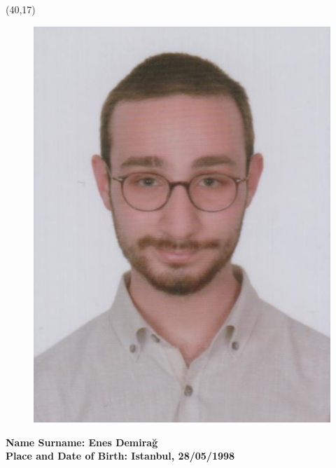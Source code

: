 \vspace{10mm}

\newsavebox{\mysquare}
\savebox{\mysquare}{\textcolor{black}{\rule[2.3pt]{3.4pt}{3.4pt}}}

\setlength{\TPHorizModule}{10pt}
\setlength{\TPVertModule}{10pt}
\begin{textblock}{1}(40,17)
  \begin{figure}[p]
    \includegraphics[scale=0.25,keepaspectratio=true]{figures/vesikalik-enes.png}
  \end{figure}

\end{textblock}
\textbf{Name Surname: {\normalfont Enes Demirağ}} \\

\vspace{-3mm}
\textbf{Place and Date of Birth: {\normalfont Istanbul, 28/05/1998}} \\

